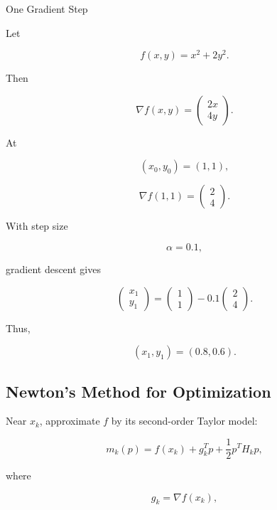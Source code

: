 \begin{workedexamplebox}{One Gradient Step}

Let

\[
f(x,y)
=
x^2+2y^2.
\]

Then

\[
\nabla f(x,y)
=
\begin{pmatrix}
2x\\
4y
\end{pmatrix}.
\]

At

\[
(x_0,y_0)
=
(1,1),
\]

\[
\nabla f(1,1)
=
\begin{pmatrix}
2\\
4
\end{pmatrix}.
\]

With step size

\[
\alpha=0.1,
\]

gradient descent gives

\[
\begin{pmatrix}
x_1\\
y_1
\end{pmatrix}
=
\begin{pmatrix}
1\\
1
\end{pmatrix}
-
0.1
\begin{pmatrix}
2\\
4
\end{pmatrix}.
\]

Thus,

\begin{answerbox}
\[
\boxed{
(x_1,y_1)
=
(0.8,0.6).
}
\]
\end{answerbox}

\end{workedexamplebox}

\subsection{Newton's Method for Optimization}
\label{subsec:newton-method-optimization}

Near \(x_k\), approximate \(f\) by its second-order Taylor model:

\[
\boxed{
m_k(p)
=
f(x_k)
+
g_k^Tp
+
\frac12
p^TH_kp,
}
\]

where

\[
g_k
=
\nabla f(x_k),
\]

